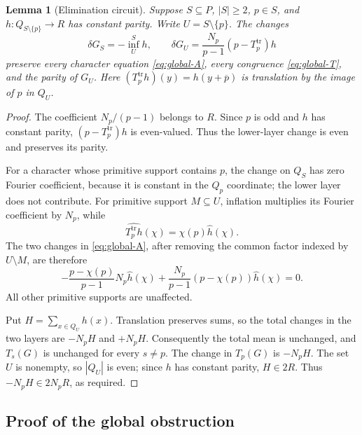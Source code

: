 \documentclass[11pt]{amsart}
\newtheorem{lemma}[theorem]{Lemma}
\theoremstyle{definition}
\theoremstyle{remark}
\numberwithin{equation}{section}
\begin{document}
\begin{lemma}[Elimination circuit]\label{lem:global-circuit}
Suppose $S\subseteq P$, $|S|\ge2$, $p\in S$, and
$h:Q_{S\setminus\{p\}}\to R$ has constant parity. Write
$U=S\setminus\{p\}$. The changes
\begin{equation}\label{eq:global-circuit}
 \delta G_S=-\operatorname{inf}_{U}^{S}h,
 \qquad
 \delta G_U=\frac{N_p}{p-1}(p-T_p^{\mathrm{tr}})h
\end{equation}
preserve every character equation \eqref{eq:global-A}, every congruence
\eqref{eq:global-T}, and the parity of $G_U$. Here
$(T_p^{\mathrm{tr}}h)(y)=h(y+\overline p)$ is translation by the image
of $p$ in $Q_U$.
\end{lemma}

\begin{proof}
The coefficient $N_p/(p-1)$ belongs to $R$. Since $p$ is odd and
$h$ has constant parity, $(p-T_p^{\mathrm{tr}})h$ is even-valued.
Thus the lower-layer change is even and preserves its parity.

For a character whose primitive support contains $p$, the change on
$Q_S$ has zero Fourier coefficient, because it is constant in the
$Q_p$ coordinate; the lower layer does not contribute. For primitive
support $M\subseteq U$, inflation multiplies its Fourier coefficient
by $N_p$, while
\[
 \widehat{T_p^{\mathrm{tr}}h}(\chi)=\chi(p)\widehat h(\chi).
\]
The two changes in \eqref{eq:global-A}, after removing the common
factor indexed by $U\setminus M$, are therefore
\[
 -\frac{p-\chi(p)}{p-1}N_p\widehat h(\chi)
 +\frac{N_p}{p-1}(p-\chi(p))\widehat h(\chi)=0.
\]
All other primitive supports are unaffected.

Put $H=\sum_{x\in Q_U}h(x)$. Translation preserves sums, so the
total changes in the two layers are $-N_pH$ and $+N_pH$.
Consequently the total mean is unchanged, and $T_s(G)$ is unchanged
for every $s\ne p$. The change in $T_p(G)$ is $-N_pH$.
The set $U$ is nonempty, so $|Q_U|$ is even; since $h$ has constant
parity, $H\in2R$. Thus $-N_pH\in2N_pR$, as required.
\end{proof}

\subsection{Proof of the global obstruction}
\end{document}
